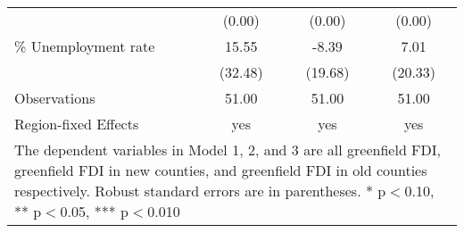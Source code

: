 \begin{table}[!htbp]
\begin{tabular}{l*{3}{c}}
                    &              (0.00)   &              (0.00)   &              (0.00)   \\
\% Unemployment rate&               15.55   &               -8.39   &                7.01   \\
                    &             (32.48)   &             (19.68)   &             (20.33)   \\
\hline
Observations        &               51.00   &               51.00   &               51.00   \\
Region-fixed Effects&                 yes   &                 yes   &                 yes   \\
\hline\hline
\multicolumn{4}{p{0.75\linewidth}}{\footnotesize The dependent variables in Model 1, 2, and 3 are all greenfield FDI, greenfield FDI in new counties, and greenfield FDI in old counties respectively. Robust standard errors are in parentheses. * p$<$0.10, ** p$<$0.05, *** p$<$0.010}\\
\end{tabular}
\end{table}
